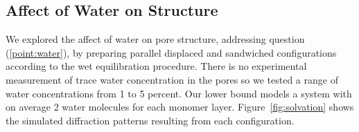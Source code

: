\documentclass[journal=jpcbfk,manusciprt=article]{achemso}
\begin{document}
  \subsection{Affect of Water on Structure}



  We explored the affect of water on pore structure, addressing question
  (\ref{point:water}), by preparing parallel displaced and sandwiched
  configurations according to the wet equilibration procedure. There is no
  experimental measurement of trace water concentration in the pores so we tested
  a range of water concentrations from 1 to 5 percent. Our lower bound models a
  system with on average 2 water molecules for each monomer layer.
  Figure~\ref{fig:solvation} shows the simulated diffraction patterns resulting
  from each configuration.

  \newlength{\tempdima}
  \newcommand{\rowname}[1]%
  {\rotatebox{90}{\makebox[\tempdima][c]{\textbf{#1}}}}
  
  \renewcommand{\thesubfigure}{\alph{subfigure}}
  \newcommand{\mycaption}[1]%
  {\refstepcounter{subfigure}\textbf{(\thesubfigure) }{\ignorespaces #1}}
  
\end{document}
